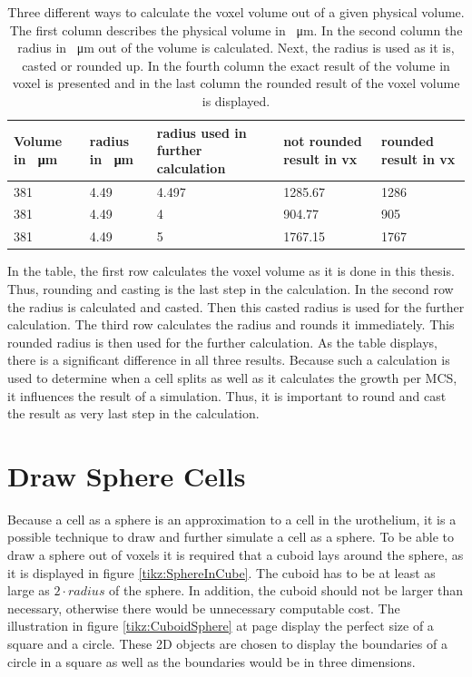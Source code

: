 \begin{table}[ht]
\centering
\caption[Different calculations of the convertion of a physical unit into the voxel unit]{Three different ways to calculate the voxel volume out of a given physical volume. The first column describes the physical volume in \SI{}{\micro\metre}. In the second column the radius in \SI{}{\micro\metre} out of the volume is calculated. Next, the radius is used as it is, casted or rounded up. In the fourth column the exact result of the volume in voxel is presented and in the last column the rounded result of the voxel volume is displayed. \newline}
\renewcommand{\arraystretch}{1.5}
	\begin{tabularx}{\textwidth}{|X|X|X|X|X|}
	\hline
		Volume in \SI{}{\micro\metre} & radius in \SI{}{\micro\metre} & radius used in further calculation & not rounded result in vx & rounded result in vx  \\
		\hline
		\hline
		381 & 4.49 & 4.497 & 1285.67 & 1286 \\
		\hline
		381 & 4.49 & 4 & 904.77 & 905\\
		\hline
		381 & 4.49 & 5 & 1767.15 & 1767
\tabularnewline
\hline 
	\end{tabularx}
	\label{tbl:Approximation error3D}
\end{table}

In the table, the first row calculates the voxel volume as it is done in this thesis. Thus, rounding and casting is the last step in the calculation. In the second row the radius is calculated and casted. Then this casted radius is used for the further calculation. The third row calculates the radius and rounds it immediately. This rounded radius is then used for the further calculation. \newline
As the table displays, there is a significant difference in all three results. Because such a calculation is used to determine when a cell splits as well as it calculates the growth per \ac{MCS}, it influences the result of a simulation. Thus, it is important to round and cast the result as very last step in the calculation.




\section{Draw Sphere Cells}\label{sec:DrawSphereCells}
Because a cell as a sphere is an approximation to a cell in the urothelium, it is a possible technique to draw and further simulate a cell as a sphere. \newline 
To be able to draw a sphere out of voxels it is required that a cuboid lays around the sphere, as it is displayed in figure \ref{tikz:SphereInCube}. The cuboid has to be at least as large as $2 \cdot radius$ of the sphere. In addition, the cuboid should not be larger than necessary, otherwise there would be unnecessary computable cost. The illustration in figure \ref{tikz:CuboidSphere} at page \pageref{tikz:CuboidSphere} display the perfect size of a square and a circle. These 2D objects are chosen to display the boundaries of a circle in a square as well as the boundaries would be in three dimensions.


